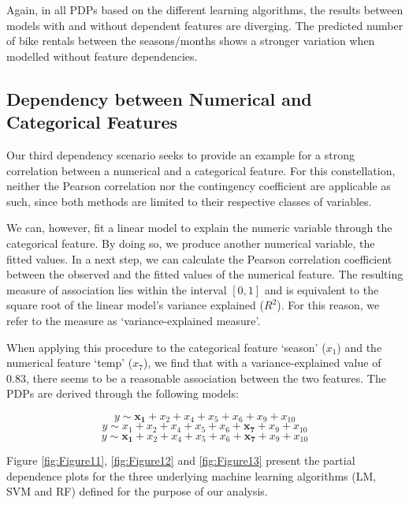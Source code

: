 \documentclass[
]{krantz}
\begin{document}
Again, in all PDPs based on the different learning algorithms, the results between models with and without dependent features are diverging. The predicted number of bike rentals between the seasons/months shows a stronger variation when modelled without feature dependencies.

\hypertarget{NumCat}{%
\subsection{Dependency between Numerical and Categorical Features}\label{NumCat}}

Our third dependency scenario seeks to provide an example for a strong correlation between a numerical and a categorical feature. For this constellation, neither the Pearson correlation nor the contingency coefficient are applicable as such, since both methods are limited to their respective classes of variables.

We can, however, fit a linear model to explain the numeric variable through the categorical feature. By doing so, we produce another numerical variable, the fitted values. In a next step, we can calculate the Pearson correlation coefficient between the observed and the fitted values of the numerical feature. The resulting measure of association lies within the interval \([0,1]\) and is equivalent to the square root of the linear model's variance explained (\(R^2\)).\citep{fahrmeir2013regression} For this reason, we refer to the measure as `variance-explained measure'.

When applying this procedure to the categorical feature `season' (\(x_1\)) and the numerical feature `temp' (\(x_7\)), we find that with a variance-explained value of 0.83, there seems to be a reasonable association between the two features. The PDPs are derived through the following models:

\begin{equation}
y \sim \mathbf{x_1} + x_2 + x_4 + x_5 + x_6 + x_9 + x_{10} \label{eq:7}
\end{equation}
\begin{equation}
y \sim x_1 + x_2 + x_4 + x_5 + x_6 + \mathbf{x_7}+ x_9 + x_{10} \label{eq:8}
\end{equation}
\begin{equation}
y \sim \mathbf{x_1} + x_2  + x_4 + x_5 + x_6 +\mathbf{x_7}+ x_9 + x_{10} \label{eq:9}
\end{equation}

Figure \ref{fig:Figure11}, \ref{fig:Figure12} and \ref{fig:Figure13} present the partial dependence plots for the three underlying machine learning algorithms (LM, SVM and RF) defined for the purpose of our analysis.
\end{document}
